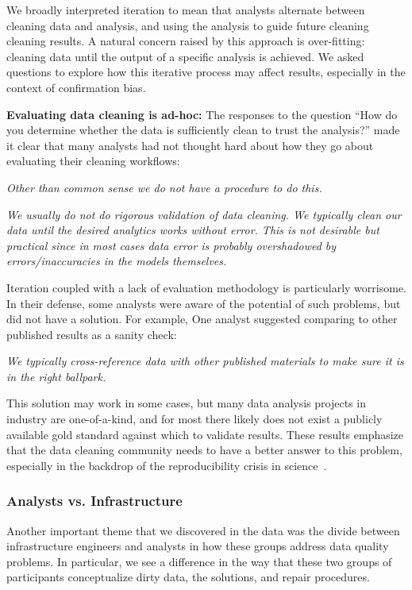 \vspace{0.5em}
We broadly interpreted iteration to mean that analysts alternate between cleaning data and analysis, and using the analysis to guide future cleaning cleaning results.
A natural concern raised by this approach is over-fitting: cleaning data until the output of a specific analysis is achieved.
We asked questions to explore how this iterative process may affect results, especially in the context of confirmation bias.

\vspace{0.5em}
\noindent\textbf{Evaluating data cleaning is ad-hoc:}
The responses to the question ``How do you determine whether the data is sufficiently clean to trust the analysis?'' made it clear that many analysts had not thought hard about how they go about evaluating their cleaning workflows:

\vspace{0.5em}
\emph{Other than common sense we do not have a procedure to do this.}

\vspace{0.7em}
\emph{We usually do not do rigorous validation of data cleaning. We typically clean our data until the desired analytics works without error. This is not desirable but practical since in most cases data error is probably overshadowed by errors/inaccuracies in the models themselves.}

\vspace{0.5em}

Iteration coupled with a lack of evaluation methodology is particularly worrisome.
In their defense, some analysts were aware of the potential of such problems, but did not have a solution.
For example, One analyst suggested comparing to other published results as a sanity check:

\vspace{0.5em}
\emph{We typically cross-reference data with other published materials to make sure it is in the right ballpark.}
\vspace{0.5em}

This solution may work in some cases, but many data analysis projects in industry are one-of-a-kind, and for most there likely does not exist a publicly available gold standard against which to validate results.
These results emphasize that the data cleaning community needs to have a better answer to this problem, especially in the backdrop of the reproducibility crisis in science~\cite{reproducibility}.

\subsubsection{Analysts vs. Infrastructure}
Another important theme that we discovered in the data was the divide between infrastructure engineers and analysts in how these groups address data quality problems. In particular, we see a difference in the way that these two groups of participants conceptualize dirty data, the solutions, and repair procedures.

